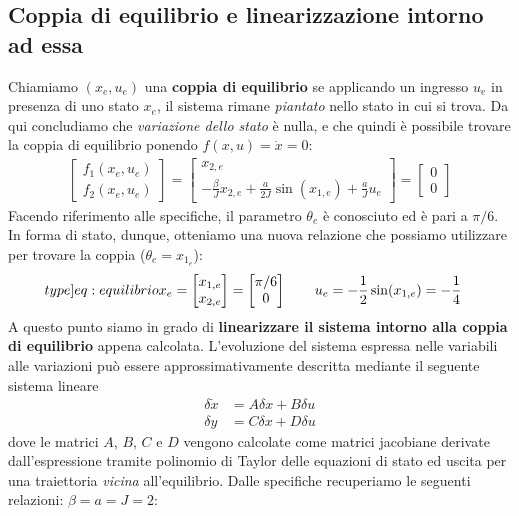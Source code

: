 \documentclass[a4paper, 11pt]{article}
\begin{document}
\subsection{Coppia di equilibrio e linearizzazione intorno ad essa}
Chiamiamo $(x_e, u_e)$ una \textbf{coppia di equilibrio} se applicando un ingresso $u_e$ in presenza di uno stato $x_e$, il sistema rimane \textit{piantato} nello stato in cui si trova. Da qui concludiamo che \textit{variazione dello stato} è nulla, e che quindi è possibile trovare la coppia di equilibrio ponendo $f(x, u) = \dot x = 0$:
\begin{align*}
	\begin{bmatrix}
		f_1(x_e, u_e) \\ f_2 (x_e, u_e)
	\end{bmatrix} = \begin{bmatrix}
		x_{2,e} \\ -\frac{\beta}{J} x_{2,e} + \frac{a}{2J} \sin(x_{1,e}) + \frac{a}{J} u_e
	\end{bmatrix} = \begin{bmatrix}
		0 \\ 0
	\end{bmatrix}
\end{align*}
Facendo riferimento alle specifiche, il parametro $\theta_e$ è conosciuto ed è pari a $\pi/6$. In forma di stato, dunque, otteniamo una nuova relazione che possiamo utilizzare per trovare la coppia ($\theta_e = x_{1_e}$):
\begin{align}\label[type]{eq:equilibrio}
	x_e = \begin{bmatrix}
		x_{1,e} \\ x_{2,e}
	\end{bmatrix} = \begin{bmatrix}
		\pi / 6 \\ 0
	\end{bmatrix} \quad \quad
   u_e & = - \frac{1}{2} \sin(x_{1,e}) = - \frac{1}{4}
\end{align}
A questo punto siamo in grado di \textbf{linearizzare il sistema intorno alla coppia di equilibrio} appena calcolata.
%
L'evoluzione del sistema espressa nelle variabili alle variazioni pu\`o essere approssimativamente descritta mediante il seguente sistema lineare
%
\begin{align*}
	\delta \dot{x} &= A\delta x + B\delta u
	\\
	\delta y &= C\delta x + D\delta u
\end{align*}
%
dove le matrici $A$, $B$, $C$ e $D$ vengono calcolate come matrici jacobiane derivate dall'espressione tramite polinomio di Taylor delle equazioni di stato ed uscita per una traiettoria \textit{vicina} all'equilibrio. Dalle specifiche recuperiamo le seguenti relazioni: $\beta = a = J = 2$:
\end{document}
